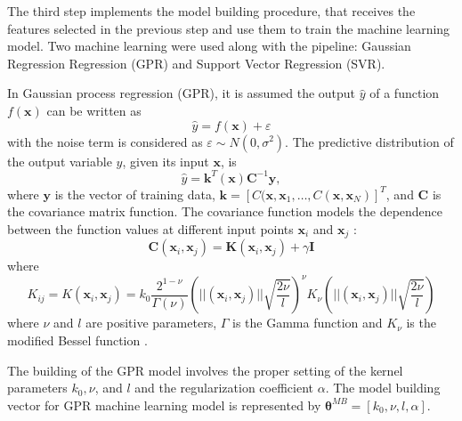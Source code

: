 \documentclass[a4paper,12pt, english]{article}
\newcommand{\x}{\mathbf{x}}
\newcommand{\xp}{\bm{\theta}}
\newcommand{\xmb}{\xp^{MB}}
\begin{document}
The third step implements the model building procedure, that receives the features selected in the previous step and use them to train the machine learning model.
Two machine learning were used along with the pipeline: Gaussian Regression Regression (GPR) and Support Vector Regression (SVR).

{\color{red}
In Gaussian process regression (GPR), it is assumed the output $\hat{y}$ of a function  $f(\x)$ can be written as 
\[
 \hat{y} = f(\x) + \varepsilon
\]
with the noise term is considered as $\varepsilon \sim N(0, \sigma^2)$. The predictive distribution of the output variable $\hat{y}$, given its input $\x$, is \cite{wang2015159}
\[
 \hat{y} = \mathbf{k}^T(\x) \mathbf{C}^{-1}\mathbf{y},
\]
where 
$\mathbf{y}$ is the vector of training data, 
$\mathbf{k} = [ C(\x, \x_1, \dots, C(\x, \x_N) ]^T$, and $\mathbf{C}$ is the covariance matrix function.
The covariance function   models the dependence between the function values at different input points  $\x_i$ and $\x_j$ \cite{schulz:20181}:
\[
\mathbf{C}(\x_i, \x_j) = \mathbf{K}(\x_i, \x_j) + \gamma \mathbf{I}
\]
where 
\begin{equation}
 \label{eq:gpr-kernel-matern}
  K_{ij} = K(\x_i, \x_j) = 
  k_0 \frac{2^{1-\nu}}{\Gamma(\nu)}  
 \left( ||(\x_i, \x_j)|| \sqrt{\frac{2\nu}{l}} \right)^{\nu} 
 K_{\nu}\left( ||(\x_i, \x_j)|| \sqrt{\frac{2\nu}{l} } \right)
\end{equation}
where $\nu$ and $l$ are positive parameters, $\Gamma$ is the Gamma function and $ K_{\nu}$ is the modified Bessel function \cite{kumar:2020101986}.

The building of the GPR model involves the proper setting of the kernel parameters
${k_0}, {\nu}$, and  ${l}$ and the regularization coefficient ${\alpha}$.
The model building vector for GPR machine learning model is represented by
$\xmb = [ {k_0}, {\nu}, {l}, {\alpha} ]$.
}
\end{document}
